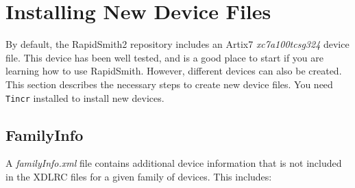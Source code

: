 \newpage
\section{Installing New Device Files}
By default, the RapidSmith2 repository includes an Artix7 {\em xc7a100tcsg324}
device file. This device has been well tested, and is a good place to start if
you are learning how to use RapidSmith. However, different devices can also be created.
This section describes the necessary steps to create new device files. You need
\texttt{Tincr} installed to install new devices. 

\subsection{FamilyInfo}
A \textit{familyInfo.xml} file contains additional device information that is
not included in the XDLRC files for a given family of devices. This includes:

